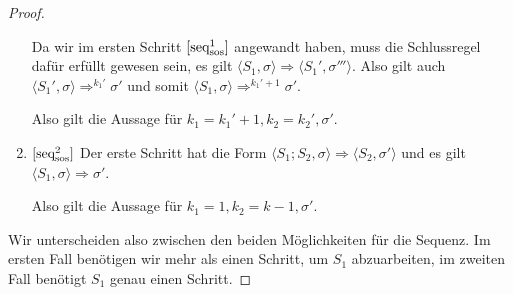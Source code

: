 \begin{proof}
\begin{enumerate}
            Da wir im ersten Schritt $\infruleSos[1]{seq}$ angewandt haben, muss die Schlussregel dafür erfüllt gewesen sein, \dh{} es gilt $\langle S_1, \sigma \rangle \Rightarrow \langle S_1', \sigma''' \rangle$. Also gilt auch $\langle S_1', \sigma \rangle \Rightarrow^{k_1'} \sigma'$ und somit $\langle S_1, \sigma \rangle \Rightarrow^{k_1'+1} \sigma'$.

            Also gilt die Aussage für $k_1 = k_1' + 1, k_2 = k_2', \sigma'$.
        \item $\infruleSos[2]{seq}$ Der erste Schritt hat die Form $\langle S_1; S_2, \sigma \rangle \Rightarrow \langle S_2, \sigma' \rangle$ und es gilt $\langle S_1, \sigma \rangle \Rightarrow \sigma'$.

            Also gilt die Aussage für $k_1 = 1, k_2 = k - 1, \sigma'$.
    \end{enumerate}

    Wir unterscheiden also zwischen den beiden Möglichkeiten für die Sequenz. Im ersten Fall benötigen wir mehr als einen Schritt, um $S_1$ abzuarbeiten, im zweiten Fall benötigt $S_1$ genau einen Schritt.
\end{proof}


